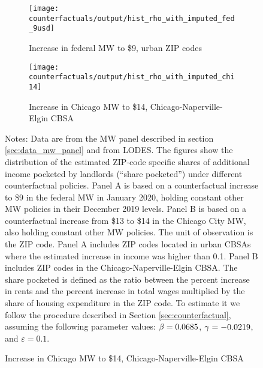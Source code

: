 \begin{figure}[h!]
    \centering
    \caption{Estimated shares pocketed by landlords under counterfactual MW policies}
    \label{fig:cf_hist_shares}

    \begin{subfigure}{0.75\textwidth} \centering
        \caption{Increase in federal MW to \$9, urban ZIP codes}
        \texttt{[image: counterfactuals/output/hist\_rho\_with\_imputed\_fed\_9usd]}
    \end{subfigure}

    \begin{subfigure}{0.75\textwidth} \centering
        \caption{Increase in Chicago MW to \$14, Chicago-Naperville-Elgin CBSA}
        \texttt{[image: counterfactuals/output/hist\_rho\_with\_imputed\_chi14]}
    \end{subfigure}

    \begin{minipage}{.95\textwidth} \footnotesize
        \vspace{3mm}
        Notes:
        Data are from the MW panel described in section \ref{sec:data_mw_panel} 
        and from LODES.
        The figures show the distribution of the estimated ZIP-code specific
        shares of additional income pocketed by landlords (``share pocketed'')
        under different counterfactual policies.
        Panel A is based on a counterfactual increase to \$9 in the 
        federal MW in January 2020, holding constant other MW policies in their 
        December 2019 levels.
        Panel B is based on a counterfactual increase from \$13 to \$14 in the 
        Chicago City MW, also holding constant other MW policies.
        The unit of observation is the ZIP code.
        Panel A includes ZIP codes located in urban CBSAs where the estimated 
        increase in income was higher than 0.1.
        Panel B includes ZIP codes in the Chicago-Naperville-Elgin CBSA.
        The share pocketed is defined as the ratio between the percent increase 
        in rents and the percent increase in total wages multiplied by the share 
        of housing expenditure in the ZIP code.
        To estimate it we follow the procedure described in Section 
        \ref{sec:counterfactual}, assuming the following parameter values: 
        $\beta = 0.0685$, $\gamma = -0.0219$, and $\varepsilon = 0.1$.
    \end{minipage}
\end{figure}
